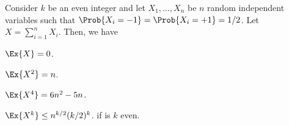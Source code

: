 \begin{lemma}
    Consider $k$ be an even integer and let $X_1, \ldots, X_n$ be $n$
    random independent variables such that
    $\Prob{X_i=-1} = \Prob{X_i =+1} = 1/2$. Let
    $X = \sum_{i=1}^n X_i$. Then, we have
    \begin{compactenumi}
        \item $\Ex{X} = 0$.
        \item $\Ex{X^2} = n$.

        \item $\Ex{X^4} = 6n^2 - 5n$.

        \item $\Ex{ X^{k}} \leq n^{k/2} (k/2)^k$.  if is $k$ even.
    \end{compactenumi}
\end{lemma}
